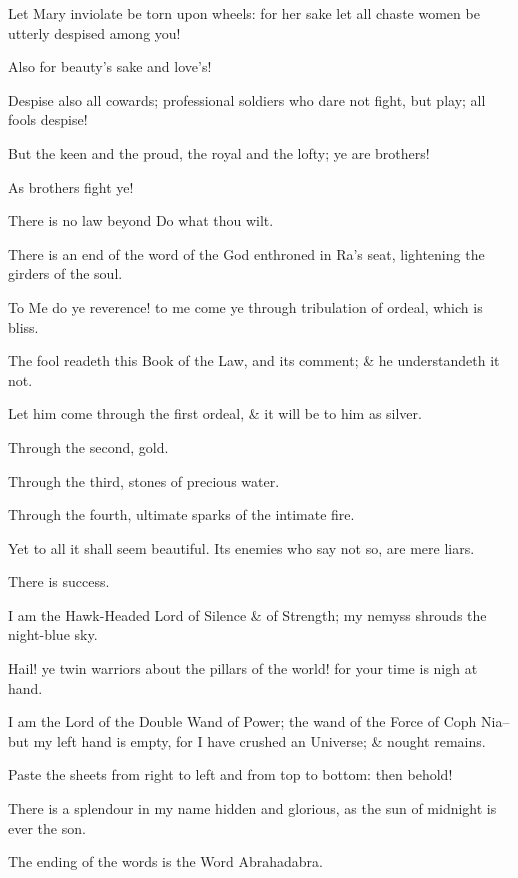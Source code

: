 Let Mary inviolate be torn upon wheels: for her sake let all chaste women be utterly despised among you!

Also for beauty's sake and love's!

Despise also all cowards; professional soldiers who dare not fight, but play; all fools despise!

But the keen and the proud, the royal and the lofty; ye are brothers!

As brothers fight ye!

There is no law beyond Do what thou wilt.

There is an end of the word of the God enthroned in Ra's seat, lightening the girders of the soul.

To Me do ye reverence! to me come ye through tribulation of ordeal, which is bliss.

The fool readeth this Book of the Law, and its comment; & he understandeth it not.

Let him come through the first ordeal, & it will be to him as silver.

Through the second, gold.

Through the third, stones of precious water.

Through the fourth, ultimate sparks of the intimate fire.

Yet to all it shall seem beautiful. Its enemies who say not so, are mere liars.

There is success.

I am the Hawk-Headed Lord of Silence & of Strength; my nemyss shrouds the night-blue sky.

Hail! ye twin warriors about the pillars of the world! for your time is nigh at hand.

I am the Lord of the Double Wand of Power; the wand of the Force of Coph Nia--but my left hand is empty, for I have crushed an Universe; & nought remains.

Paste the sheets from right to left and from top to bottom: then behold!

There is a splendour in my name hidden and glorious, as the sun of midnight is ever the son.

The ending of the words is the Word Abrahadabra.